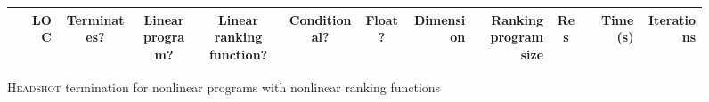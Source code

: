 \documentclass[preprint]{sigplanconf}
\theoremstyle{definition}
\begin{document}
\begin{figure*}
\centering
\small
\begin{tabular}{|l|r|c|c|c|c|c|r|r|c|r|r|}
\hline
    & LOC & Terminates? & \shortstack{Linear \\ program?} & \shortstack{Linear ranking \\ function?}  & Conditional? & Float? & Dimension & \shortstack{Ranking \\ program size} & Res & Time (s) & Iterations\\
    \hline
    \hline

    \hline
\end{tabular}

\caption{\textsc{Headshot} termination for nonlinear programs with nonlinear ranking functions\label{fig:nonlinear}}
 \end{figure*}



{}
\end{document}
